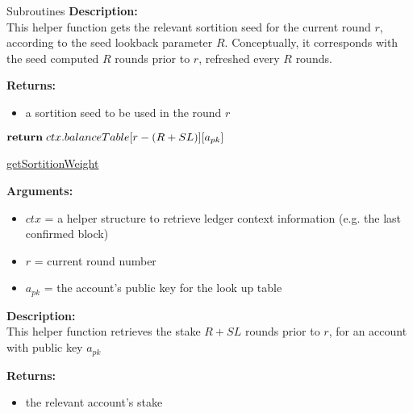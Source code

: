 \documentclass[10pt,a4paper]{article}
\begin{document}
\begin{section}{Subroutines}
\noindent \textbf{Description:}\\
This helper function gets the relevant sortition seed for the current round $r$, according to the seed lookback parameter $R$.
Conceptually, it corresponds with the seed computed $R$ rounds prior to $r$, refreshed every $R$ rounds.

\noindent \textbf{Returns:}
\begin{itemize}
    \item a sortition seed to be used in the round $r$
  \end{itemize}


\begin{algorithm}[H]
    \begin{algorithmic}[1]

            $\Return\;ctx.balanceTable[r - (R + SL)][a_{pk}]$

        \EndFunction
    \end{algorithmic}
    \caption{\underline{getSortitionWeight}}
\end{algorithm}

\noindent \textbf{Arguments:}
\begin{itemize}
    \item $ctx$ = a helper structure to retrieve ledger context information (e.g. the last confirmed block)
    \item $r$ = current round number
    \item $a_{pk}$ = the account's public key for the look up table
  \end{itemize}


\noindent \textbf{Description:}\\
This helper function retrieves the stake $R + SL$ rounds prior to $r$, for an account
with public key $a_{pk}$

\noindent \textbf{Returns:}
\begin{itemize}
    \item the relevant account's stake
  \end{itemize}




\begin{algorithm}[H]
    \begin{algorithmic}[1]
        

\end{algorithmic}
\end{algorithm}
\end{section}
\end{document}
